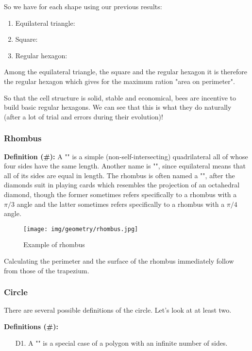 {	So we have for each shape using our previous results:
	\begin{enumerate}
		\item Equilateral triangle:
			
		\item Square:
			

		\item Regular hexagon:
			
	\end{enumerate}
	Among the equilateral triangle, the square and the regular hexagon it is therefore the regular hexagon which gives for the maximum ration "area on perimeter".
	
	So that the cell structure is solid, stable and economical, bees are incentive to build basic regular hexagons. We can see that this is what they do naturally (after a lot of trial and errors during their evolution)!
	
	\subsubsection{Rhombus}
	\textbf{Definition (\#\mydef):} A "" is a simple (non-self-intersecting) quadrilateral all of whose four sides have the same length. Another name is "", since equilateral means that all of its sides are equal in length. The rhombus is often named a "", after the diamonds suit in playing cards which resembles the projection of an octahedral diamond, though the former sometimes refers specifically to a rhombus with a $\pi/3$ angle and the latter sometimes refers specifically to a rhombus with a $\pi/4$ angle.
	
	\begin{figure}[H]
		\centering
		\texttt{[image: img/geometry/rhombus.jpg]}
		\caption{Example of rhombus}
	\end{figure}
	Calculating the perimeter and the surface of the rhombus immediately follow from those of the trapezium.
	
	\pagebreak
	\subsubsection{Circle}
	There are several possible definitions of the circle. Let's look at at least two.
	
	\textbf{Definitions (\#\mydef):}
	\begin{enumerate}
		\item[D1.] A "" is a special case of a polygon with an infinite number of sides.
		

\end{enumerate}}

